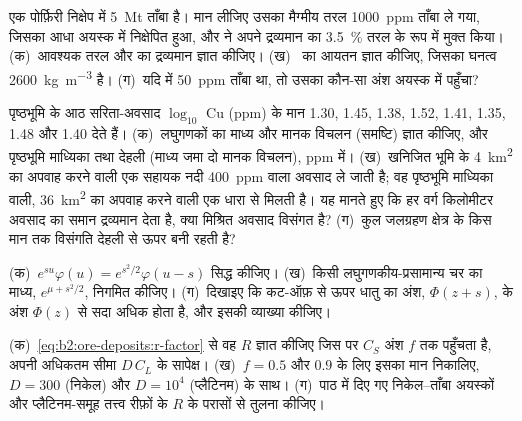 \begin{exercise}[$\star\star$]\label{exo:b2:ore-deposits:8}
एक पोर्फ़िरी निक्षेप में \qty{5}{Mt} ताँबा है। मान लीजिए उसका मैग्मीय तरल \qty{1000}{ppm}
ताँबा ले गया, जिसका आधा अयस्क में निक्षेपित हुआ, और  ने अपने द्रव्यमान का \qty{3.5}{\percent}
तरल के रूप में मुक्त किया। (क)~आवश्यक तरल और  का द्रव्यमान ज्ञात कीजिए। (ख)~ का आयतन ज्ञात
कीजिए, जिसका घनत्व \qty{2600}{kg.m^{-3}} है। (ग)~यदि  में \qty{50}{ppm} ताँबा था, तो उसका कौन-सा
अंश अयस्क में पहुँचा?
\end{exercise}

\begin{exercise}[$\star\star$]\label{exo:b2:ore-deposits:9}
पृष्ठभूमि के आठ सरिता-अवसाद $\log_{10}$ Cu (ppm) के मान 1.30, 1.45, 1.38, 1.52, 1.41, 1.35,
1.48 और 1.40 देते हैं। (क)~लघुगणकों का माध्य और मानक विचलन (समष्टि) ज्ञात कीजिए, और पृष्ठभूमि माध्यिका
तथा देहली (माध्य जमा दो मानक विचलन), ppm में। (ख)~खनिजित भूमि के \qty{4}{km^2} का अपवाह करने वाली
एक सहायक नदी \qty{400}{ppm} वाला अवसाद ले जाती है; वह पृष्ठभूमि माध्यिका वाली, \qty{36}{km^2} का अपवाह
करने वाली एक धारा से मिलती है। यह मानते हुए कि हर वर्ग किलोमीटर अवसाद का समान द्रव्यमान देता है, क्या
मिश्रित अवसाद विसंगत है? (ग)~कुल जलग्रहण क्षेत्र के किस मान तक विसंगति देहली से ऊपर
बनी रहती है?
\end{exercise}

\begin{exercise}[$\star\star\star$]\label{exo:b2:ore-deposits:10}
(क)~$e^{su}\varphi(u) = e^{s^2/2}\varphi(u - s)$ सिद्ध कीजिए। (ख)~किसी लघुगणकीय-प्रसामान्य चर का
माध्य, $e^{\mu + s^2/2}$, निगमित कीजिए। (ग)~दिखाइए कि कट-ऑफ़ से ऊपर धातु का अंश,
$\Phi(z + s)$,  के अंश $\Phi(z)$ से सदा अधिक होता है, और इसकी व्याख्या कीजिए।
\end{exercise}

\begin{exercise}[$\star\star\star$]\label{exo:b2:ore-deposits:11}
(क)~\eqref{eq:b2:ore-deposits:r-factor} से वह $R$ ज्ञात कीजिए जिस पर $C_S$ अंश $f$ तक पहुँचता है, अपनी
अधिकतम सीमा $D\,C_L$ के सापेक्ष। (ख)~$f = 0.5$ और $0.9$ के लिए इसका मान निकालिए, $D = 300$ (निकेल) और $D =
10^4$ (प्लैटिनम) के साथ। (ग)~पाठ में दिए गए निकेल--ताँबा अयस्कों और प्लैटिनम-समूह तत्त्व
रीफ़ों के $R$ के परासों से तुलना कीजिए।
\end{exercise}

